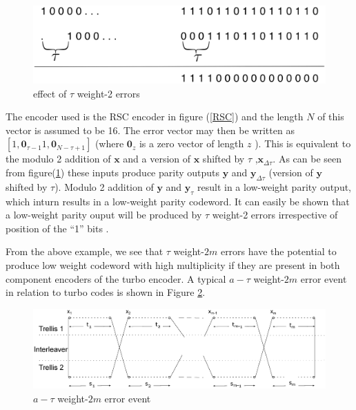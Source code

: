 \documentclass[a4paper, 12pt, oneside, openary]{jbook}
\begin{document}
\begin{figure}[h!]
\centering
		\includegraphics[width=\textwidth]{RSCExample.eps}
		\caption{ effect of $\tau$ weight-2 errors}
		\label{RSC3}
		\end{figure}
	
 The encoder used is the RSC encoder in figure (\ref{RSC})
  and the length $N$ of this vector is assumed to 
be 16. The error vector may then be written as $[1, \mathbf{0}_{\tau-1} 1, \mathbf{0}_{N-\tau+1}]$
(where $\mathbf{0}_z$ is a zero vector of length $z$ ).
This is equivalent to the modulo 2 addition of $\mathbf{x}$ and a version of
 $\mathbf{x}$ shifted by $\tau$ ,$\mathbf{x}_{\Delta\tau}$. As can be seen from 
figure(\ref{RSC3}) these inputs produce parity outputs $\mathbf{y}$ and $\mathbf{y}_{\Delta \tau}$
(version of $\mathbf{y}$ shifted by $\tau$). Modulo 2 addition of $\mathbf{y}$ and
$\mathbf{y}_{\tau}$ result in a low-weight parity output, which inturn results
in a low-weight parity codeword. It can easily be shown that a low-weight parity ouput
will be produced by $\tau$ weight-2 errors irrespective of position of the ``1'' bits . 

 From the above example, we see that $\tau$ weight-$2m$ errors have the potential to
produce low weight codeword with high multiplicity if they are present in both 
component encoders of the turbo encoder. 
A typical $a-\tau$ weight-$2m$ error event in relation to turbo codes is shown in Figure \ref{2m_error}.

\begin{figure}[h!]
\centering
\includegraphics[width=\textwidth]{weight2m.eps}
\caption{$a-\tau$ weight-$2m$ error event}
\label{2m_error}
\end{figure}
\end{document}
